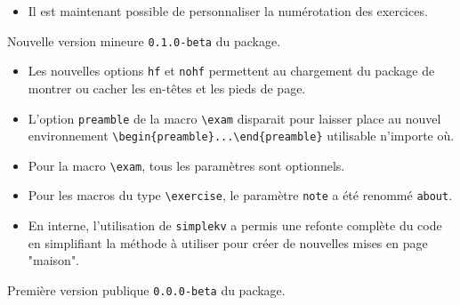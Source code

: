 \documentclass[12pt,a4paper]{scrartcl}
\begin{document}
\begin{description}[leftmargin=1em]
\begin{itemize}
        \item Il est maintenant possible de personnaliser la numérotation des exercices.
    \end{itemize}

    \item[2017-11-12] Nouvelle version mineure \verb+0.1.0-beta+ du package.
    \begin{itemize}
        \item Les nouvelles options \verb+hf+ et \verb+nohf+ permettent au chargement du package de montrer ou cacher les en-têtes et les pieds de page.

        \item L'option \verb+preamble+ de la macro \verb+\exam+ disparait pour laisser place au nouvel environnement \verb+\begin{preamble}...\end{preamble}+ utilisable n'importe où.

        \item Pour la macro \verb+\exam+, tous les paramètres sont optionnels.

        \item Pour les macros du type \verb+\exercise+, le paramètre \verb+note+ a été renommé \verb+about+.

        \item En interne, l'utilisation de \verb+simplekv+ a permis une refonte complète du code en simplifiant la méthode à utiliser pour créer de nouvelles mises en page "maison".
    \end{itemize}

    \item[2017-11-03] Première version publique \verb+0.0.0-beta+ du package.
\end{description}
\end{document}
